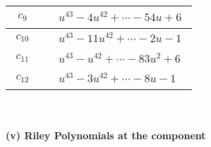 \documentclass[1p]{elsarticle_modified}
\theoremstyle{definition}
\begin{document}
\begin{tabular}{m{50pt}|m{274pt}}
\hline $$\begin{aligned}c_{9}\end{aligned}$$&$\begin{aligned}
&u^{43}-4 u^{42}+\cdots-54 u+6
\end{aligned}$\\
\hline $$\begin{aligned}c_{10}\end{aligned}$$&$\begin{aligned}
&u^{43}-11 u^{42}+\cdots-2 u-1
\end{aligned}$\\
\hline $$\begin{aligned}c_{11}\end{aligned}$$&$\begin{aligned}
&u^{43}- u^{42}+\cdots-83 u^2+6
\end{aligned}$\\
\hline $$\begin{aligned}c_{12}\end{aligned}$$&$\begin{aligned}
&u^{43}-3 u^{42}+\cdots-8 u-1
\end{aligned}$\\
\hline
\end{tabular}\\~\\
\newpage\renewcommand{\arraystretch}{1}
\flushleft \textbf{(v) Riley Polynomials at the component}\newline \\
\end{document}

